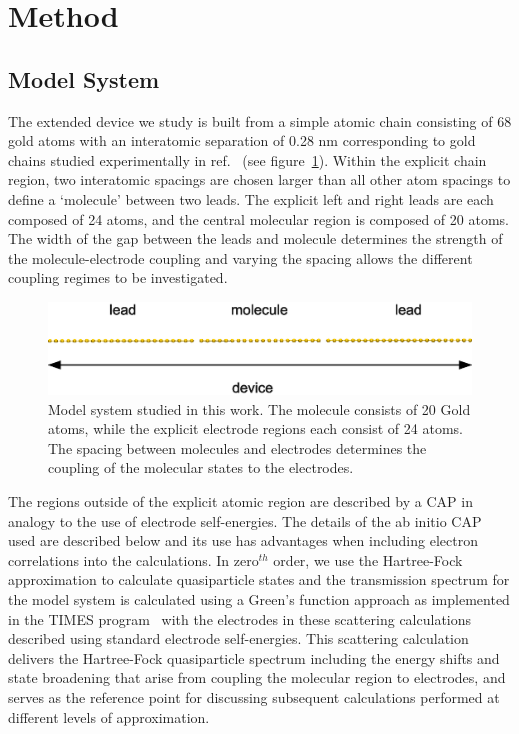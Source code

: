 \section{Method}
\label{sec:method}

\subsection{Model System}
\label{subsec:modelsystem}

The extended device we study is built from a simple atomic chain
consisting of 68 gold atoms with an interatomic separation of 0.28 nm
corresponding to gold chains studied experimentally in
ref.~\cite{nilius2002science} (see figure~\ref{fig:chaincapdevice}).
Within the explicit chain region, two interatomic spacings are chosen
larger than all other atom spacings to define a `molecule' between two
leads. The explicit left and right leads are each composed of 24 atoms,
and the central molecular region is composed of 20 atoms. The width of
the gap between the leads and molecule determines the strength of the
molecule-electrode coupling and varying the spacing allows the different
coupling regimes to be investigated. 

\begin{figure}
	\begin{center}
		\includegraphics[width=0.9\linewidth]{figures/chaincapdevice}
	\end{center}
	\caption{Model system studied in this work. The molecule consists of
        20 Gold atoms, while the explicit electrode regions each consist of 24
	atoms. The spacing between molecules and electrodes determines the
	coupling of the molecular states to the electrodes.}
	\label{fig:chaincapdevice}
\end{figure}

The regions outside of the explicit atomic region are described by a
\ac{CAP} in analogy to the use of electrode self-energies. The details of
the ab initio \ac{CAP} used are described below and its use has advantages
when including electron correlations into the calculations. In
zero$^{th}$ order, we use the Hartree-Fock approximation to calculate
quasiparticle states and the transmission spectrum for the model system
is calculated using a Green's function approach as
implemented in the TIMES program~\cite{times} with the electrodes in
these scattering calculations described using standard electrode self-energies.
This scattering calculation delivers the Hartree-Fock quasiparticle
spectrum including the energy shifts and state broadening that arise
from coupling the molecular region to electrodes, and serves as the
reference point for discussing subsequent calculations performed at
different levels of approximation.

